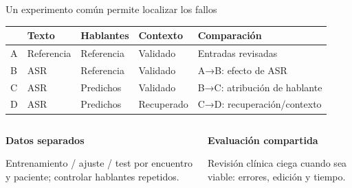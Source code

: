 \documentclass[aspectratio=169,10pt]{beamer}
\begin{document}
\begin{frame}{Un experimento común permite localizar los fallos}
  \vspace{1mm}
  {\small\renewcommand{\arraystretch}{1.05}
  \begin{tabularx}{\textwidth}{L{.5cm}XXX L{3.2cm}}
    \toprule
    & \textbf{Texto} & \textbf{Hablantes} & \textbf{Contexto} & \textbf{Comparación}\\
    \midrule
    A & Referencia & Referencia & Validado & Entradas revisadas\\
    B & ASR & Referencia & Validado & A→B: efecto de ASR\\
    C & ASR & Predichos & Validado & B→C: atribución de hablante\\
    D & ASR & Predichos & Recuperado & C→D: recuperación/contexto\\
    \bottomrule
  \end{tabularx}}
  \vspace{3mm}
  \begin{columns}[T,onlytextwidth]
    \begin{column}{.47\textwidth}\small\textbf{Datos separados}\par Entrenamiento / ajuste / test por encuentro y paciente; controlar hablantes repetidos.\end{column}
    \begin{column}{.49\textwidth}\small\textbf{Evaluación compartida}\par Revisión clínica ciega cuando sea viable: errores, edición y tiempo.\end{column}
  \end{columns}
\end{frame}
\end{document}

